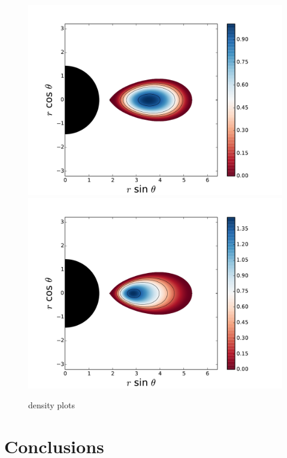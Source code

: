 \documentclass{aa}
\begin{document}
\begin{figure}
\centering
\includegraphics[scale=0.4]{images/1.pdf}
\includegraphics[scale=0.4]{images/2.pdf}
\caption{density plots}
           \label{FigGam}%
 \end{figure}


\section{Conclusions}

%
\end{document}
